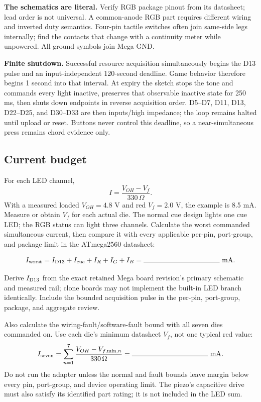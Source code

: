 \documentclass[11pt]{article}
\newcommand{\blank}[1]{\rule{#1}{0.4pt}}
\begin{document}
\textbf{The schematics are literal.} Verify RGB package pinout from its
datasheet; lead order is not universal. A common-anode RGB part requires
different wiring and inverted duty semantics. Four-pin tactile switches often
join same-side legs internally; find the contacts that change with a continuity
meter while unpowered. All ground symbols join Mega GND.

\textbf{Finite shutdown.} Successful resource acquisition simultaneously
begins the D13 pulse and an input-independent 120-second deadline. Game behavior
therefore begins 1 second into that interval. At expiry the sketch stops the
tone and commands every light inactive, preserves that observable inactive
state for 250 ms, then shuts down endpoints in reverse acquisition order.
D5--D7, D11, D13, D22--D25, and D30--D33 are then inputs/high impedance; the
loop remains halted until upload or reset. Buttons never control this deadline,
so a near-simultaneous press remains chord evidence only.

\subsection{Current budget}

For each LED channel,
\[
    I=\frac{V_{OH}-V_f}{330\,\Omega}.
\]
With a measured loaded \(V_{OH}=4.8\) V and red \(V_f=2.0\) V, the example is
8.5 mA. Measure or obtain \(V_f\) for each actual die. The normal cue design
lights one cue LED; the RGB status can light three channels. Calculate the
worst commanded simultaneous current, then compare it with every applicable
per-pin, port-group, and package limit in the ATmega2560 datasheet:

\[
 I_{\rm worst}=I_{\rm D13}+I_{\rm cue}+I_R+I_G+I_B
 =\blank{1.5in}\ {\rm mA}.
\]

Derive \(I_{\rm D13}\) from the exact retained Mega board revision's primary
schematic and measured rail; clone boards may not implement the built-in LED
branch identically. Include the bounded acquisition pulse in the per-pin,
port-group, package, and aggregate review.

Also calculate the wiring-fault/software-fault bound with all seven dies
commanded on. Use each die's minimum datasheet \(V_f\), not one typical red
value:
\[
 I_{\rm seven}=\sum_{n=1}^{7}
 \frac{V_{OH}-V_{f,\min,n}}{330\,\Omega}
 =\blank{1.5in}\ {\rm mA}.
\]
Do not run the adapter unless the normal and fault bounds leave margin below
every pin, port-group, and device operating limit. The piezo's capacitive drive
must also satisfy its identified part rating; it is not included in the LED
sum.
\end{document}
